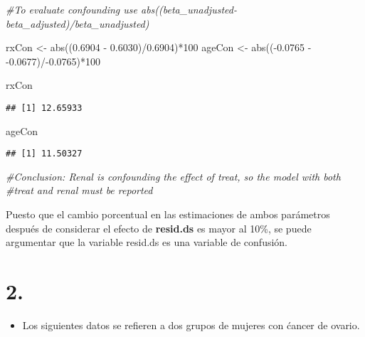 \documentclass[
]{article}
\newenvironment{Shaded}{\begin{snugshade}}{\end{snugshade}}
\newcommand{\CommentTok}[1]{\textcolor[rgb]{0.56,0.35,0.01}{\textit{#1}}}
\newcommand{\DecValTok}[1]{\textcolor[rgb]{0.00,0.00,0.81}{#1}}
\newcommand{\FloatTok}[1]{\textcolor[rgb]{0.00,0.00,0.81}{#1}}
\newcommand{\FunctionTok}[1]{\textcolor[rgb]{0.00,0.00,0.00}{#1}}
\newcommand{\NormalTok}[1]{#1}
\newcommand{\OtherTok}[1]{\textcolor[rgb]{0.56,0.35,0.01}{#1}}
\newcommand{\SpecialCharTok}[1]{\textcolor[rgb]{0.00,0.00,0.00}{#1}}
\providecommand{\tightlist}{%
  \setlength{\itemsep}{0pt}\setlength{\parskip}{0pt}}
\begin{document}
\begin{Shaded}
\begin{Highlighting}[]
\CommentTok{\#To evaluate confounding use abs((beta\_unadjusted{-}beta\_adjusted)/beta\_unadjusted)}

\NormalTok{rxCon }\OtherTok{\textless{}{-}} \FunctionTok{abs}\NormalTok{((}\FloatTok{0.6904} \SpecialCharTok{{-}} \FloatTok{0.6030}\NormalTok{)}\SpecialCharTok{/}\FloatTok{0.6904}\NormalTok{)}\SpecialCharTok{*}\DecValTok{100}
\NormalTok{ageCon }\OtherTok{\textless{}{-}} \FunctionTok{abs}\NormalTok{((}\SpecialCharTok{{-}}\FloatTok{0.0765} \SpecialCharTok{{-}} \SpecialCharTok{{-}}\FloatTok{0.0677}\NormalTok{)}\SpecialCharTok{/{-}}\FloatTok{0.0765}\NormalTok{)}\SpecialCharTok{*}\DecValTok{100}

\NormalTok{rxCon}
\end{Highlighting}
\end{Shaded}

\begin{verbatim}
## [1] 12.65933
\end{verbatim}

\begin{Shaded}
\begin{Highlighting}[]
\NormalTok{ageCon}
\end{Highlighting}
\end{Shaded}

\begin{verbatim}
## [1] 11.50327
\end{verbatim}

\begin{Shaded}
\begin{Highlighting}[]
\CommentTok{\#Conclusion: Renal is confounding the effect of treat, so the model with both}
\CommentTok{\#treat and renal must be reported}
\end{Highlighting}
\end{Shaded}

Puesto que el cambio porcentual en las estimaciones de ambos parámetros
después de considerar el efecto de \textbf{resid.ds} es mayor al 10\%,
se puede argumentar que la variable resid.ds es una variable de
confusión.

\section{2.}

\begin{itemize}
\tightlist
\item
  Los siguientes datos se refieren a dos grupos de mujeres con ćancer de
  ovario.
\end{itemize}
\end{document}
